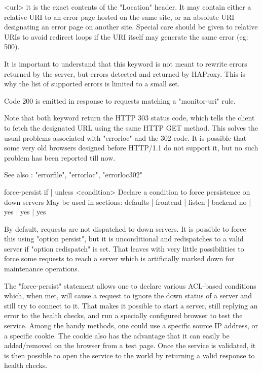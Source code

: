     <url>     it is the exact contents of the "Location" header. It may contain
              either a relative URI to an error page hosted on the same site,
              or an absolute URI designating an error page on another site.
              Special care should be given to relative URIs to avoid redirect
              loops if the URI itself may generate the same error (eg: 500).

  It is important to understand that this keyword is not meant to rewrite
  errors returned by the server, but errors detected and returned by HAProxy.
  This is why the list of supported errors is limited to a small set.

  Code 200 is emitted in response to requests matching a "monitor-uri" rule.

  Note that both keyword return the HTTP 303 status code, which tells the
  client to fetch the designated URL using the same HTTP GET method. This
  solves the usual problems associated with "errorloc" and the 302 code. It is
  possible that some very old browsers designed before HTTP/1.1 do not support
  it, but no such problem has been reported till now.

  See also : "errorfile", "errorloc", "errorloc302"


force-persist { if | unless } <condition>
  Declare a condition to force persistence on down servers
  May be used in sections:    defaults | frontend | listen | backend
                                  no   |    yes   |   yes  |   yes

  By default, requests are not dispatched to down servers. It is possible to
  force this using "option persist", but it is unconditional and redispatches
  to a valid server if "option redispatch" is set. That leaves with very little
  possibilities to force some requests to reach a server which is artificially
  marked down for maintenance operations.

  The "force-persist" statement allows one to declare various ACL-based
  conditions which, when met, will cause a request to ignore the down status of
  a server and still try to connect to it. That makes it possible to start a
  server, still replying an error to the health checks, and run a specially
  configured browser to test the service. Among the handy methods, one could
  use a specific source IP address, or a specific cookie. The cookie also has
  the advantage that it can easily be added/removed on the browser from a test
  page. Once the service is validated, it is then possible to open the service
  to the world by returning a valid response to health checks.

